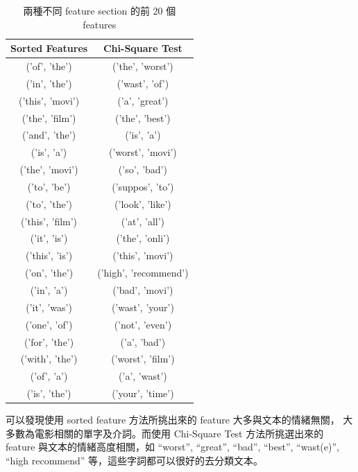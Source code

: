 \documentclass{article}[12pt]
\begin{document}
\begin{table}[H]
    \centering
    \caption{兩種不同 feature section 的前 20 個 features}
    \begin{tabular}{@{}cc@{}}
    \toprule
    \textbf{Sorted Features} & \textbf{Chi-Square Test} \\ \midrule
    ('of', 'the')            & ('the', 'worst')         \\
    ('in', 'the')            & ('wast', 'of')           \\
    ('this', 'movi')         & ('a', 'great')           \\
    ('the', 'film')          & ('the', 'best')          \\
    ('and', 'the')           & ('is', 'a')              \\
    ('is', 'a')              & ('worst', 'movi')        \\
    ('the', 'movi')          & ('so', 'bad')            \\
    ('to', 'be')             & ('suppos', 'to')         \\
    ('to', 'the')            & ('look', 'like')         \\
    ('this', 'film')         & ('at', 'all')            \\
    ('it', 'is')             & ('the', 'onli')          \\
    ('this', 'is')           & ('this', 'movi')         \\
    ('on', 'the')            & ('high', 'recommend')    \\
    ('in', 'a')              & ('bad', 'movi')          \\
    ('it', 'was')            & ('wast', 'your')         \\
    ('one', 'of')            & ('not', 'even')          \\
    ('for', 'the')           & ('a', 'bad')             \\
    ('with', 'the')          & ('worst', 'film')        \\
    ('of', 'a')              & ('a', 'wast')            \\
    ('is', 'the')            & ('your', 'time')         \\ \bottomrule
    \end{tabular}
\end{table}

可以發現使用 sorted feature 方法所挑出來的 feature 大多與文本的情緒無關，
大多數為電影相關的單字及介詞。而使用 Chi-Square Test 方法所挑選出來的 feature 
與文本的情緒高度相關，如 ``worst'', ``great'', ``bad'', ``best'', ``wast(e)'', 
``high recommend'' 等，這些字詞都可以很好的去分類文本。
\end{document}
